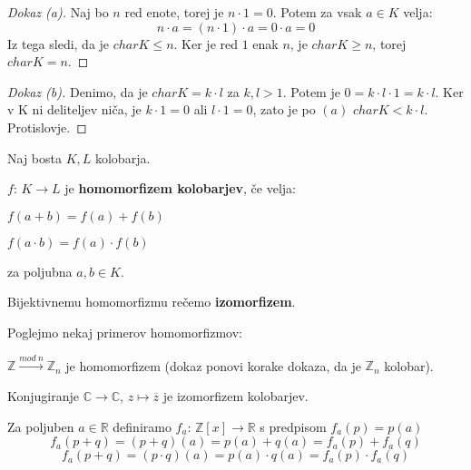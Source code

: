 \documentclass[11pt, a4paper]{article}
\begin{document}
    \begin{proof}[Dokaz \emph{(a)}]
        Naj bo \(n\) red enote, torej je \(n \cdot 1 = 0\). Potem za vsak \(a \in K\) velja:
        \[n \cdot a = (n \cdot 1) \cdot a = 0 \cdot a = 0\]
        Iz tega sledi, da je \(char K \le n\). Ker je red \(1\) enak \(n\), je \(char K \ge n\), torej \(char K = n\).
    \end{proof}

    \begin{proof}[Dokaz \emph{(b)}]
            Denimo, da je \(char K = k \cdot l\) za \(k,l > 1\). Potem je \(0 = k \cdot l \cdot 1 = k \cdot l\). Ker v K ni deliteljev niča, je \(k \cdot 1 = 0\) ali \(l \cdot 1 = 0\), zato je po \((a)\) \(char K < k \cdot l\). Protislovje.
    \end{proof}

    \begin{definition}
        Naj bosta \(K,L\) kolobarja.
        \par
        \(f\): \(K \rightarrow L\) je \textbf{homomorfizem kolobarjev}, če velja:
        \begin{center}
            \(f(a + b) = f(a) + f(b)\)
        \end{center}
        \begin{center}
            \(f(a \cdot b) = f(a) \cdot f(b)\)
        \end{center}
        za poljubna \(a,b \in K\).
    \end{definition}

    Bijektivnemu homomorfizmu rečemo \textbf{izomorfizem}.
    \par
    Poglejmo nekaj primerov homomorfizmov:

    \begin{example}
        \(\mathbb{Z} \xrightarrow{mod\ n} \mathbb{Z}_n\) je homomorfizem (dokaz ponovi korake dokaza, da je \(\mathbb{Z}_n\) kolobar).
    \end{example}

    \begin{example}
        Konjugiranje \(\mathbb{C} \to \mathbb{C}\), \(z \mapsto \overline{z}\) je izomorfizem kolobarjev.
    \end{example}

    \begin{example}
        Za poljuben \(a \in \mathbb{R}\) definiramo \(f_a\): \(\mathbb{Z}[x] \rightarrow \mathbb{R}\) s predpisom \(f_a(p) = p(a)\)
        \[f_a(p + q) = (p + q)(a) = p(a) + q(a) = f_a(p) + f_a(q)\]
        \[f_a(p + q) = (p \cdot q)(a) = p(a) \cdot q(a) = f_a(p) \cdot f_a(q)\]
    \end{example}
\end{document}
